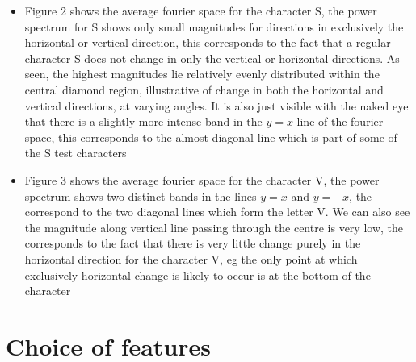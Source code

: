 \documentclass[a4paper,12px,twocolumn]{article}
\begin{document}
\begin{flushleft}
{\begin{itemize}
    \item Figure 2 shows the average fourier space for the character S, the power spectrum for S shows only small magnitudes for directions
    in exclusively the horizontal or vertical direction, this corresponds to the fact that a regular character S does not change in only
    the vertical or horizontal directions. As seen, the highest magnitudes lie relatively evenly distributed within the central diamond
    region, illustrative of change in both the horizontal and vertical directions, at varying angles. It is also just visible with the naked eye
    that there is a slightly more intense band in the $y=x$ line of the fourier space, this corresponds to the almost diagonal line which is part
    of some of the S test characters

    \item Figure 3 shows the average fourier space for the character V, the power spectrum shows two distinct bands in the lines $y = x$ and $y=-x$,
    the correspond to the two diagonal lines which form the letter V. We can also see the magnitude along vertical line
    passing through the centre is very low, the corresponds to the fact that there is very little change purely in the horizontal direction for the
    character V, eg the only point at which exclusively horizontal change is likely to occur is at the bottom of the character

\end{itemize}
}

\section{Choice of features}
    \bigskip


\end{flushleft}
\end{document}
